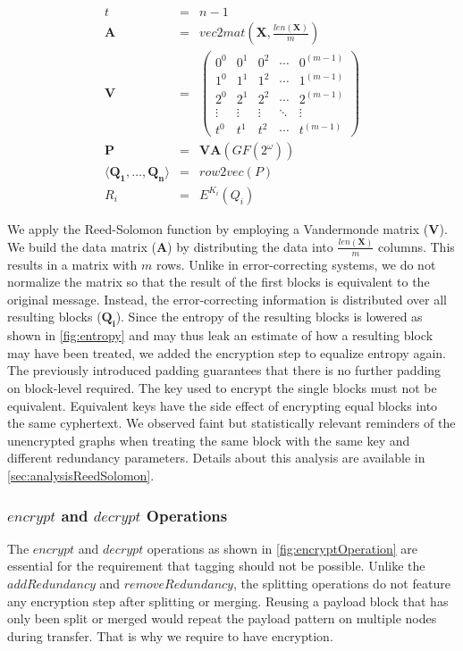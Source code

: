 \begin{eqnarray}
	t          & = & n-1\\%
	\mathbf{A} & = & vec2mat\left(\mathbf{X},\frac{len\left(\mathbf{X}\right)}{m}\right)\\
	\mathbf{V} & = & \left(\begin{matrix}
		0^0 & 0^1 & 0^2 & \cdots & 0^{(m-1)} \\
		1^0 & 1^1 & 1^2 & \cdots & 1^{(m-1)} \\
		2^0 & 2^1 & 2^2 & \cdots & 2^{(m-1)} \\
		\vdots & \vdots & \vdots & \ddots & \vdots \\
		t^0 & t^1 & t^2 & \cdots & t^{(m-1)}
	\end{matrix}\right)\\
	\mathbf{P} & = & \mathbf{V}\mathbf{A} \left(GF\left(2^\omega\right)\right)\\
	\langle \mathbf{Q_1}, \ldots , \mathbf{Q_n} \rangle & = & row2vec(P)\\
	R_i & = & E^{K_i}\left(Q_i\right)
\end{eqnarray}    

We apply the Reed-Solomon function by employing a Vandermonde matrix ($\mathbf{V}$). We build the data matrix ($\mathbf{A}$) by distributing the data into $\frac{len\left(\mathbf{X}\right)}{m}$ columns. This results in a matrix with $m$ rows. Unlike in error-correcting systems, we do not normalize the matrix so that the result of the first blocks is equivalent to the original message. Instead, the error-correcting information is distributed over all resulting blocks ($\mathbf{Q_i}$). Since the entropy of the resulting blocks is lowered as shown in \cref{fig:entropy} and may thus leak an estimate of how a resulting block may have been treated, we added the encryption step to equalize entropy again. The previously introduced padding guarantees that there is no further padding on block-level required. The key used to encrypt the single blocks must not be equivalent. Equivalent keys have the side effect of encrypting equal blocks into the same cyphertext. We observed faint but statistically relevant reminders of the unencrypted graphs when treating the same block with the same key and different redundancy parameters. Details about this analysis are available in \cref{sec:analysisReedSolomon}.

\subsubsection{\texorpdfstring{$encrypt$ and $decrypt$}{encrypt and decrypt} Operations}
The $encrypt$ and $decrypt$ operations as shown in \cref{fig:encryptOperation} are essential for the requirement that tagging should not be possible. Unlike the $addRedundancy$ and $removeRedundancy$, the splitting operations do not feature any encryption step after splitting or merging. Reusing a payload block that has only been split or merged would repeat the payload pattern on multiple nodes during transfer. That is why we require to have encryption.

